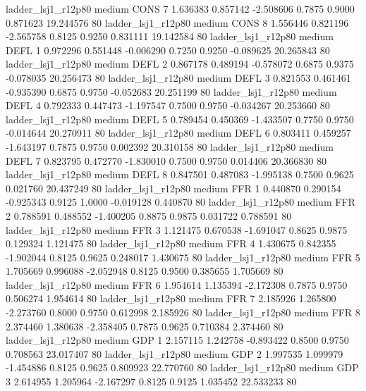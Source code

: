     ladder_lsj1_r12p80     medium     CONS                 7  1.636383 0.857142 -2.508606 0.7875 0.9000  0.871623   19.244576 80
    ladder_lsj1_r12p80     medium     CONS                 8  1.556446 0.821196 -2.565758 0.8125 0.9250  0.831111   19.142584 80
    ladder_lsj1_r12p80     medium     DEFL                 1  0.972296 0.551448 -0.006290 0.7250 0.9250 -0.089625   20.265843 80
    ladder_lsj1_r12p80     medium     DEFL                 2  0.867178 0.489194 -0.578072 0.6875 0.9375 -0.078035   20.256473 80
    ladder_lsj1_r12p80     medium     DEFL                 3  0.821553 0.461461 -0.935390 0.6875 0.9750 -0.052683   20.251199 80
    ladder_lsj1_r12p80     medium     DEFL                 4  0.792333 0.447473 -1.197547 0.7500 0.9750 -0.034267   20.253660 80
    ladder_lsj1_r12p80     medium     DEFL                 5  0.789454 0.450369 -1.433507 0.7750 0.9750 -0.014644   20.270911 80
    ladder_lsj1_r12p80     medium     DEFL                 6  0.803411 0.459257 -1.643197 0.7875 0.9750  0.002392   20.310158 80
    ladder_lsj1_r12p80     medium     DEFL                 7  0.823795 0.472770 -1.830010 0.7500 0.9750  0.014406   20.366830 80
    ladder_lsj1_r12p80     medium     DEFL                 8  0.847501 0.487083 -1.995138 0.7500 0.9625  0.021760   20.437249 80
    ladder_lsj1_r12p80     medium      FFR                 1  0.440870 0.290154 -0.925343 0.9125 1.0000 -0.019128    0.440870 80
    ladder_lsj1_r12p80     medium      FFR                 2  0.788591 0.488552 -1.400205 0.8875 0.9875  0.031722    0.788591 80
    ladder_lsj1_r12p80     medium      FFR                 3  1.121475 0.670538 -1.691047 0.8625 0.9875  0.129324    1.121475 80
    ladder_lsj1_r12p80     medium      FFR                 4  1.430675 0.842355 -1.902044 0.8125 0.9625  0.248017    1.430675 80
    ladder_lsj1_r12p80     medium      FFR                 5  1.705669 0.996088 -2.052948 0.8125 0.9500  0.385655    1.705669 80
    ladder_lsj1_r12p80     medium      FFR                 6  1.954614 1.135394 -2.172308 0.7875 0.9750  0.506274    1.954614 80
    ladder_lsj1_r12p80     medium      FFR                 7  2.185926 1.265800 -2.273760 0.8000 0.9750  0.612998    2.185926 80
    ladder_lsj1_r12p80     medium      FFR                 8  2.374460 1.380638 -2.358405 0.7875 0.9625  0.710384    2.374460 80
    ladder_lsj1_r12p80     medium      GDP                 1  2.157115 1.242758 -0.893422 0.8500 0.9750  0.708563   23.017407 80
    ladder_lsj1_r12p80     medium      GDP                 2  1.997535 1.099979 -1.454886 0.8125 0.9625  0.809923   22.770760 80
    ladder_lsj1_r12p80     medium      GDP                 3  2.614955 1.205964 -2.167297 0.8125 0.9125  1.035452   22.533233 80
